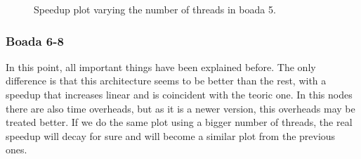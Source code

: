 \documentclass[12pt, a4paper]{article}
\begin{document}
\begin{figure}[ht]
\begin{minipage}[b]{0.45\linewidth}
\caption{Speedup plot varying the number of threads in boada 5.}
\label{fig:strong_v5_2}
\end{minipage}
\end{figure}

\subsubsection{Boada 6-8}

In this point, all important things have been explained before. The only difference is that this architecture seems to be better than the rest, with a speedup that increases linear and is coincident with the teoric one. In this nodes there are also time overheads, but as it is a newer version, this overheads may be treated better. If we do the same plot using a bigger number of threads, the real speedup will decay for sure and will become a similar plot from the previous ones.
\end{document}
